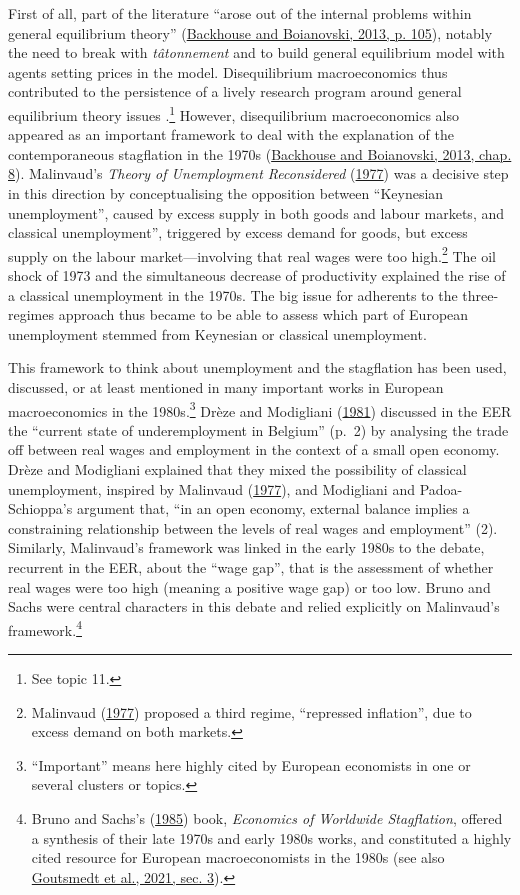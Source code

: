 \documentclass[
  12pt,
  onecolumn]{article}
\begin{document}
First of all, part of the literature ``arose out of the internal
problems within general equilibrium theory''
(\protect\hyperlink{ref-backhouseboianovski2013}{Backhouse and
Boianovski, 2013, p. 105}), notably the need to break with
\emph{tâtonnement} and to build general equilibrium model with agents
setting prices in the model. Disequilibrium macroeconomics thus
contributed to the persistence of a lively research program around
general equilibrium theory issues .\footnote{See topic 11.} However,
disequilibrium macroeconomics also appeared as an important framework to
deal with the explanation of the contemporaneous stagflation in the
1970s (\protect\hyperlink{ref-backhouseboianovski2013}{Backhouse and
Boianovski, 2013, chap. 8}). Malinvaud's \emph{Theory of Unemployment
Reconsidered} (\protect\hyperlink{ref-malinvaud1977}{1977}) was a
decisive step in this direction by conceptualising the opposition
between ``Keynesian unemployment'', caused by excess supply in both
goods and labour markets, and classical unemployment'', triggered by
excess demand for goods, but excess supply on the labour
market---involving that real wages were too high.\footnote{Malinvaud
  (\protect\hyperlink{ref-malinvaud1977}{1977}) proposed a third regime,
  ``repressed inflation'', due to excess demand on both markets.} The
oil shock of 1973 and the simultaneous decrease of productivity
explained the rise of a classical unemployment in the 1970s. The big
issue for adherents to the three-regimes approach thus became to be able
to assess which part of European unemployment stemmed from Keynesian or
classical unemployment.

This framework to think about unemployment and the stagflation has been
used, discussed, or at least mentioned in many important works in
European macroeconomics in the 1980s.\footnote{``Important'' means here
  highly cited by European economists in one or several clusters or
  topics.} Drèze and Modigliani
(\protect\hyperlink{ref-dreze1981}{1981}) discussed in the EER the
``current state of underemployment in Belgium'' (p.~2) by analysing the
trade off between real wages and employment in the context of a small
open economy. Drèze and Modigliani explained that they mixed the
possibility of classical unemployment, inspired by Malinvaud
(\protect\hyperlink{ref-malinvaud1977}{1977}), and Modigliani and
Padoa-Schioppa's argument that, ``in an open economy, external balance
implies a constraining relationship between the levels of real wages and
employment'' (2). Similarly, Malinvaud's framework was linked in the
early 1980s to the debate, recurrent in the EER, about the ``wage gap'',
that is the assessment of whether real wages were too high (meaning a
positive wage gap) or too low. Bruno and Sachs were central characters
in this debate and relied explicitly on Malinvaud's
framework.\footnote{Bruno and Sachs's
  (\protect\hyperlink{ref-brunosachs1985}{1985}) book, \emph{Economics
  of Worldwide Stagflation}, offered a synthesis of their late 1970s and
  early 1980s works, and constituted a highly cited resource for
  European macroeconomists in the 1980s (see also
  \protect\hyperlink{ref-goutsmedt2021}{Goutsmedt et al., 2021, sec.
  3}).}
\end{document}
